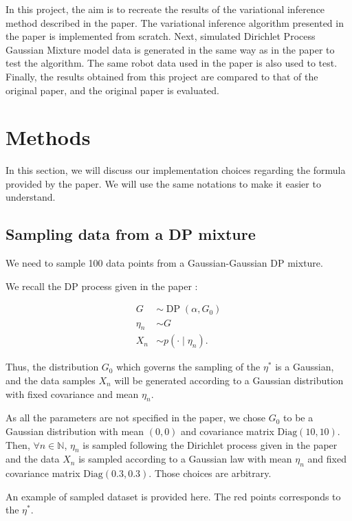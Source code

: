 \documentclass{article}
\begin{document}
In this project, the aim is to recreate the results of the variational inference method described in the paper. The variational inference algorithm presented in the paper is implemented from scratch. Next, simulated Dirichlet Process Gaussian Mixture model data is generated in the same way as in the paper to test the algorithm. The same robot data used in the paper is also used to test. Finally, the results obtained from this project are compared to that of the original paper, and the original paper is evaluated.

\section{Methods}

In this section, we will discuss our implementation choices regarding the formula provided by the paper. We will use the same notations to make it easier to understand.

\subsection{Sampling data from a DP mixture}
We need to sample 100 data points from a Gaussian-Gaussian DP mixture.

We recall the DP process given in the paper :

$$
    \begin{aligned}
        G      & \sim \operatorname{DP}\left(\alpha, G_0\right) \\
        \eta_n & \sim G                                         \\
        X_n    & \sim p\left(\cdot \mid \eta_n\right) .
    \end{aligned}
$$

Thus, the distribution $G_0$ which governs the sampling of the $\eta^*$ is a Gaussian, and the data samples $X_n$ will be generated according to a Gaussian distribution with fixed covariance and mean $\eta_n$.

As all the parameters are not specified in the paper, we chose $G_0$ to be a Gaussian distribution with mean $(0, 0)$ and covariance matrix $\text{Diag}(10, 10)$.
Then, $\forall n \in \mathbb{N}$, $\eta_n$ is sampled following the Dirichlet process given in the paper and the data $X_n$ is sampled according to a Gaussian law with mean $\eta_n$ and fixed covariance matrix $\text{Diag}(0.3, 0.3)$. Those choices are arbitrary.

An example of sampled dataset is provided here. The red points corresponds to the $\eta^*$.
\end{document}
